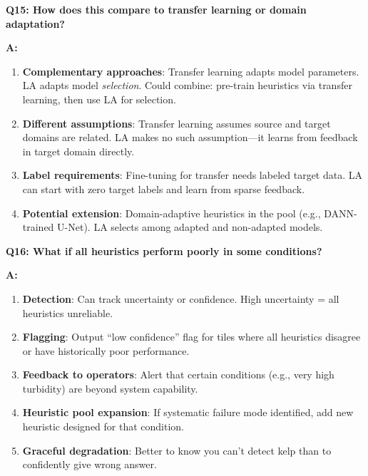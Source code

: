\documentclass[11pt]{article}
\begin{document}
\textbf{Q15: How does this compare to transfer learning or domain adaptation?}

\textbf{A:}

\begin{enumerate}
    \item \textbf{Complementary approaches}: Transfer learning adapts model parameters. LA adapts model \textit{selection}. Could combine: pre-train heuristics via transfer learning, then use LA for selection.

    \item \textbf{Different assumptions}: Transfer learning assumes source and target domains are related. LA makes no such assumption---it learns from feedback in target domain directly.

    \item \textbf{Label requirements}: Fine-tuning for transfer needs labeled target data. LA can start with zero target labels and learn from sparse feedback.

    \item \textbf{Potential extension}: Domain-adaptive heuristics in the pool (e.g., DANN-trained U-Net). LA selects among adapted and non-adapted models.
\end{enumerate}

\textbf{Q16: What if all heuristics perform poorly in some conditions?}

\textbf{A:}

\begin{enumerate}
    \item \textbf{Detection}: Can track uncertainty or confidence. High uncertainty = all heuristics unreliable.

    \item \textbf{Flagging}: Output ``low confidence'' flag for tiles where all heuristics disagree or have historically poor performance.

    \item \textbf{Feedback to operators}: Alert that certain conditions (e.g., very high turbidity) are beyond system capability.

    \item \textbf{Heuristic pool expansion}: If systematic failure mode identified, add new heuristic designed for that condition.

    \item \textbf{Graceful degradation}: Better to know you can't detect kelp than to confidently give wrong answer.
\end{enumerate}
\end{document}
